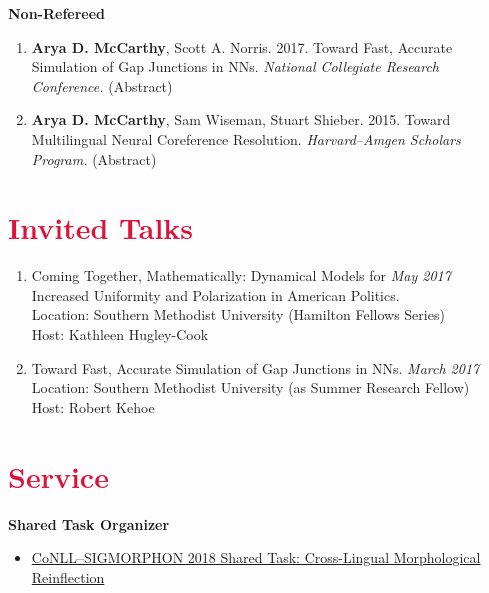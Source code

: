 \documentclass[margin, 10pt]{res} %
\newcommand{\Year}[1]{\emph{#1}}
\let\oldsection\section
\renewcommand{\section}[1]{\oldsection{\textcolor{crimson}{#1}}}
\begin{document}
\begin{resume}
\filbreak
\textbf{Non-Refereed}
\begin{enumerate}
\item \textbf{Arya D. McCarthy}, Scott A. Norris. 2017. Toward Fast, Accurate Simulation of Gap Junctions in NNs. \emph{National Collegiate Research Conference.} (Abstract)
\item \textbf{Arya D. McCarthy}, Sam Wiseman, Stuart Shieber. 2015. Toward Multilingual Neural Coreference Resolution. \emph{Harvard--Amgen Scholars Program.} (Abstract)
\end{enumerate}



\section{Invited Talks}
\begin{enumerate}
\item Coming Together, Mathematically: Dynamical Models for \hfill \Year{May 2017}\\
 Increased Uniformity and Polarization in American Politics. \\
Location: Southern Methodist University (Hamilton Fellows Series)\\
Host: Kathleen Hugley-Cook
\item Toward Fast, Accurate Simulation of Gap Junctions in NNs. \hfill \Year{March 2017}\\
Location: Southern Methodist University (as Summer Research Fellow)\\
Host: Robert Kehoe
\end{enumerate}


\section{Service}

\textbf{Shared Task Organizer}

\begin{itemize}
\item \href{https://sigmorphon.github.io/sharedtasks/2018/}{CoNLL--SIGMORPHON 2018 Shared Task: Cross-Lingual Morphological Reinflection}


\end{itemize}
\end{resume}
\end{document}
